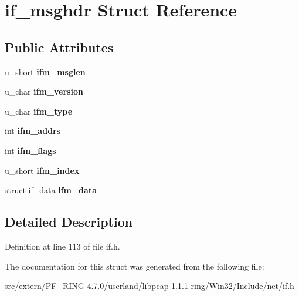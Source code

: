 \hypertarget{structif__msghdr}{
\section{if\_\-msghdr Struct Reference}
\label{structif__msghdr}
}
\subsection*{Public Attributes}
\begin{DoxyCompactItemize}
\item 
\hypertarget{structif__msghdr_a178de2ed8483dde8c5407e9cdb8952be}{
u\_\-short {\bfseries ifm\_\-msglen}}
\label{structif__msghdr_a178de2ed8483dde8c5407e9cdb8952be}

\item 
\hypertarget{structif__msghdr_a0f39cad91dbd7a53b7912426432e6452}{
u\_\-char {\bfseries ifm\_\-version}}
\label{structif__msghdr_a0f39cad91dbd7a53b7912426432e6452}

\item 
\hypertarget{structif__msghdr_a1d161744d77da830394ac44cc0b65d49}{
u\_\-char {\bfseries ifm\_\-type}}
\label{structif__msghdr_a1d161744d77da830394ac44cc0b65d49}

\item 
\hypertarget{structif__msghdr_ad650396eec50f958601d311b5e41ec2b}{
int {\bfseries ifm\_\-addrs}}
\label{structif__msghdr_ad650396eec50f958601d311b5e41ec2b}

\item 
\hypertarget{structif__msghdr_afb06a262a601dddd3462e0af055ee006}{
int {\bfseries ifm\_\-flags}}
\label{structif__msghdr_afb06a262a601dddd3462e0af055ee006}

\item 
\hypertarget{structif__msghdr_a19a3c9db410574e38f3af499c8013829}{
u\_\-short {\bfseries ifm\_\-index}}
\label{structif__msghdr_a19a3c9db410574e38f3af499c8013829}

\item 
\hypertarget{structif__msghdr_a7c3cb952eed783b54b124bf5fee771eb}{
struct \hyperlink{structif__data}{if\_\-data} {\bfseries ifm\_\-data}}
\label{structif__msghdr_a7c3cb952eed783b54b124bf5fee771eb}

\end{DoxyCompactItemize}


\subsection{Detailed Description}


Definition at line 113 of file if.h.



The documentation for this struct was generated from the following file:\begin{DoxyCompactItemize}
\item 
src/extern/PF\_\-RING-\/4.7.0/userland/libpcap-\/1.1.1-\/ring/Win32/Include/net/if.h\end{DoxyCompactItemize}
